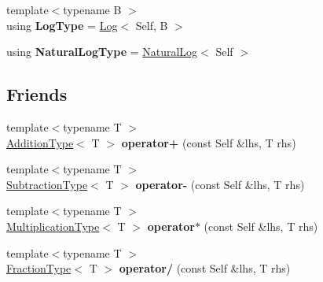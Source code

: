 \begin{DoxyCompactItemize}
\item 
\hypertarget{classlatex_1_1math_1_1Arithmetic_a4eadf0c90fdc049d2cae9666486fcbea}{{\footnotesize template$<$typename B $>$ }\\using {\bfseries Log\-Type} = \hyperlink{classlatex_1_1math_1_1Log}{Log}$<$ Self, B $>$}\label{classlatex_1_1math_1_1Arithmetic_a4eadf0c90fdc049d2cae9666486fcbea}

\item 
\hypertarget{classlatex_1_1math_1_1Arithmetic_a9915f8e5e4a9f6019e4d7e307bd52b27}{using {\bfseries Natural\-Log\-Type} = \hyperlink{classlatex_1_1math_1_1NaturalLog}{Natural\-Log}$<$ Self $>$}\label{classlatex_1_1math_1_1Arithmetic_a9915f8e5e4a9f6019e4d7e307bd52b27}

\end{DoxyCompactItemize}
\subsection*{Friends}
\begin{DoxyCompactItemize}
\item 
\hypertarget{classlatex_1_1math_1_1Arithmetic_a723185210d9371d99122644212c27804}{{\footnotesize template$<$typename T $>$ }\\\hyperlink{classlatex_1_1math_1_1Addition}{Addition\-Type}$<$ T $>$ {\bfseries operator+} (const Self \&lhs, T rhs)}\label{classlatex_1_1math_1_1Arithmetic_a723185210d9371d99122644212c27804}

\item 
\hypertarget{classlatex_1_1math_1_1Arithmetic_a52cc8d111ab9bc86be444a30821be8bd}{{\footnotesize template$<$typename T $>$ }\\\hyperlink{classlatex_1_1math_1_1Subtraction}{Subtraction\-Type}$<$ T $>$ {\bfseries operator-\/} (const Self \&lhs, T rhs)}\label{classlatex_1_1math_1_1Arithmetic_a52cc8d111ab9bc86be444a30821be8bd}

\item 
\hypertarget{classlatex_1_1math_1_1Arithmetic_a36b3fccce6395ab2e8effe6cd705195c}{{\footnotesize template$<$typename T $>$ }\\\hyperlink{classlatex_1_1math_1_1Multiplication}{Multiplication\-Type}$<$ T $>$ {\bfseries operator$\ast$} (const Self \&lhs, T rhs)}\label{classlatex_1_1math_1_1Arithmetic_a36b3fccce6395ab2e8effe6cd705195c}

\item 
\hypertarget{classlatex_1_1math_1_1Arithmetic_af953ccc64ff8027e3b02a0ccb4013ea8}{{\footnotesize template$<$typename T $>$ }\\\hyperlink{classlatex_1_1math_1_1Fraction}{Fraction\-Type}$<$ T $>$ {\bfseries operator/} (const Self \&lhs, T rhs)}\label{classlatex_1_1math_1_1Arithmetic_af953ccc64ff8027e3b02a0ccb4013ea8}

\end{DoxyCompactItemize}



